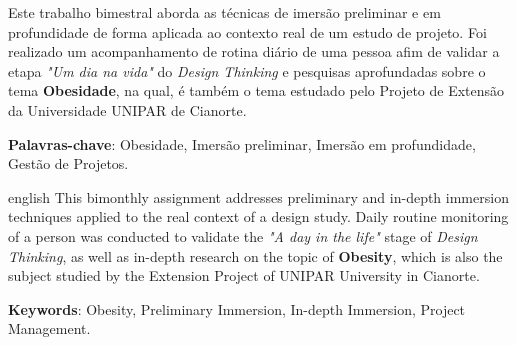 \documentclass[
	12pt,				%
	oneside,   	        %
	a4paper,			%
	chapter=TITLE,		%
	section=TITLE,		%
	subsection=TITLE,	%
	subsubsection=TITLE,%
	english,			%
	french,				%
	spanish,			%
	brazil,				%
	]{pacotes/abntex2}
\begin{document}
\frenchspacing 



\imprimirfolhaderosto



\begin{resumo}
 
 Este trabalho bimestral aborda as técnicas de imersão preliminar e em profundidade de forma aplicada ao contexto real de um estudo de projeto. Foi realizado um acompanhamento de rotina diário de uma pessoa afim de validar a etapa \textit{"Um dia na vida"} do \textit{Design Thinking} e pesquisas aprofundadas sobre o tema \textbf{Obesidade}, na qual, é também o tema estudado pelo Projeto de Extensão da Universidade UNIPAR de Cianorte.

 \vspace{\onelineskip}
    
 \noindent
 \textbf{Palavras-chave}: Obesidade, Imersão preliminar, Imersão em profundidade, Gestão de Projetos.
\end{resumo}
\begin{resumo}[Abstract]
  \begin{otherlanguage*}{english}
    This bimonthly assignment addresses preliminary and in-depth immersion techniques applied to the real context of a design study. Daily routine monitoring of a person was conducted to validate the \textit{"A day in the life"} stage of \textit{Design Thinking}, as well as in-depth research on the topic of \textbf{Obesity}, which is also the subject studied by the Extension Project of UNIPAR University in Cianorte.
    
    \vspace{\onelineskip}
    
    \noindent\textbf{Keywords}: Obesity, Preliminary Immersion, In-depth Immersion, Project Management.
  \end{otherlanguage*}
\end{resumo}

\end{document}
